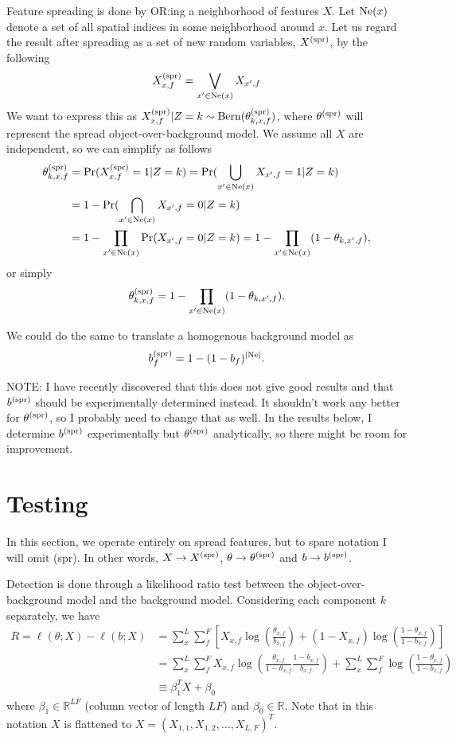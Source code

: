 \documentclass{article}
\newcommand{\Bern}[1]{\text{Bern}(#1)}
\begin{document}
Feature spreading is done by OR:ing a neighborhood of features $X$. Let $\text{Ne}(x)$ denote a set of all spatial indices in some neighborhood around $x$. Let us regard the result after spreading as a set of new random variables, $X^{\text{(spr)}}$, by the following
\[
    X^{\text{(spr)}}_{x,f} = \bigvee_{x' \in \text{Ne}(x)} X_{x',f}
\]
%
We want to express this as $\spr{X}_{x,f} | Z = k \sim \Bern{\spr{\theta}_{k,x,f}}$, where $\theta^{\text{(spr)}}$ will represent the spread object-over-background model. We assume all $X$ are independent, so we can simplify as follows 
\begin{align*}
    \theta^{\text{(spr)}}_{k,x,f} &= \Pr(X^{\text{(spr)}}_{x,f} = 1 | Z = k) = \Pr(\bigcup_{x' \in \text{Ne}(x)} X_{x',f} = 1 | Z = k) \\
    &= 1 - \Pr(\bigcap_{x' \in \text{Ne}(x)} X_{x',f} = 0 | Z = k) \\
    &= 1 - \prod_{x' \in \text{Ne}(x)} \Pr(X_{x',f} = 0 | Z = k) = 1 - \prod_{x' \in \text{Ne}(x)} (1 - \theta_{k,x',f} ),
\end{align*}
or simply
\[
    \theta^{\text{(spr)}}_{k,x,f} = 1 - \prod_{x' \in \text{Ne}(x)} (1 - \theta_{k,x',f}).
\]

We could do the same to translate a homogenous background model as
\[
    b^{\text{(spr)}}_f = 1 - (1 - b_f)^{|\text{Ne}|}.
\]

\noindent
NOTE: I have recently discovered that this does not give good results and that $b^{\text{(spr)}}$ should be experimentally determined instead. It shouldn't work any better for $\theta^{\text{(spr)}}$, so I probably need to change that as well. In the results below, I determine $b^{\text{(spr)}}$ experimentally but $\theta^{\text{(spr)}}$ analytically, so there might be room for improvement.


\section{Testing}
In this section, we operate entirely on spread features, but to spare notation I will omit (spr). In other words, $X \rightarrow X^{\text{(spr)}}$, $\theta \rightarrow \theta^{\text{(spr)}}$ and $b \rightarrow b^{\text{(spr)}}$.

Detection is done through a likelihood ratio test between the object-over-background model and the background model. Considering each component $k$ separately, we have
\begin{align*}
    R = \ell(\theta; X) - \ell(b; X) &= \sum_x^L \sum_f^F \left[ X_{x,f} \log \left(\frac{\theta_{x,f}}{b_{x,f}}\right) + (1 - X_{x,f})\log\left( \frac{1 - \theta_{x,f}}{1 - b_{x,f}}\right)\right] \\
    &= \sum_x^L\sum_f^F X_{x,f} \log \left(\frac{\theta_{x,f}}{1-\theta_{x,f}} \frac{1 - b_{x,f}}{b_{x,f}}\right) + \sum_x^L \sum_f^F \log\left(\frac{1 - \theta_{x,f}}{1 - b_{x,f}}\right) \\
    &\equiv \beta_1^T X + \beta_0 
\end{align*}
where $\beta_1 \in \mathbb{R}^{LF}$ (column vector of length $LF$) and $\beta_0 \in \mathbb{R}$. Note that in this notation $X$ is flattened to $X = (X_{1,1}, X_{1,2}, \dots, X_{L,F})^T$. 
\end{document}
